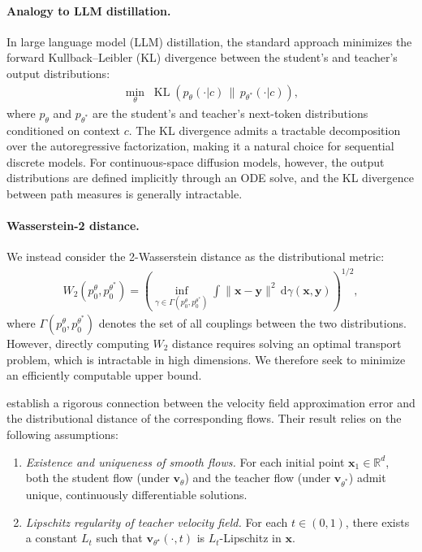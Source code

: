 \documentclass{article} %
\renewcommand{\mathbf}[1]{\bm{#1}}
\begin{document}
\paragraph{Analogy to LLM distillation.} In large language model (LLM) distillation, the standard approach minimizes the forward Kullback--Leibler (KL) divergence between the student's and teacher's output distributions:
\begin{align}
    \min_\theta \; \operatorname{KL}\!\left(p_\theta(\cdot | c) \,\|\, p_{\theta^*}(\cdot | c)\right),
\end{align}
where $p_\theta$ and $p_{\theta^*}$ are the student's and teacher's next-token distributions conditioned on context $c$. The KL divergence admits a tractable decomposition over the autoregressive factorization, making it a natural choice for sequential discrete models. For continuous-space diffusion models, however, the output distributions are defined implicitly through an ODE solve, and the KL divergence between path measures is generally intractable.

\paragraph{Wasserstein-2 distance.} We instead consider the 2-Wasserstein distance as the distributional metric:
\begin{align}
    W_2(p_0^\theta, p_0^{\theta^*}) = \left(\inf_{\gamma \in \Gamma(p_0^\theta, p_0^{\theta^*})} \int \|\mathbf{x} - \mathbf{y}\|^2 \,\mathrm{d}\gamma(\mathbf{x}, \mathbf{y})\right)^{1/2},
\end{align}
where $\Gamma(p_0^\theta, p_0^{\theta^*})$ denotes the set of all couplings between the two distributions. However, directly computing $W_2$ distance requires solving an optimal transport problem, which is intractable in high dimensions. We therefore seek to minimize an efficiently computable upper bound.

\citet{benton2023error} establish a rigorous connection between the velocity field approximation error and the distributional distance of the corresponding flows. Their result relies on the following assumptions:

\begin{enumerate}[leftmargin=*, itemsep=2pt, label=\textbf{(A\arabic*)}]
    \item \emph{Existence and uniqueness of smooth flows.} For each initial point $\mathbf{x}_1 \in \mathbb{R}^d$, both the student flow (under $\mathbf{v}_\theta$) and the teacher flow (under $\mathbf{v}_{\theta^*}$) admit unique, continuously differentiable solutions.
    \item \emph{Lipschitz regularity of teacher velocity field.} For each $t \in (0, 1)$, there exists a constant $L_t$ such that $\mathbf{v}_{\theta^\star}(\cdot, t)$ is $L_t$-Lipschitz in $\mathbf{x}$.
\end{enumerate}
\end{document}
